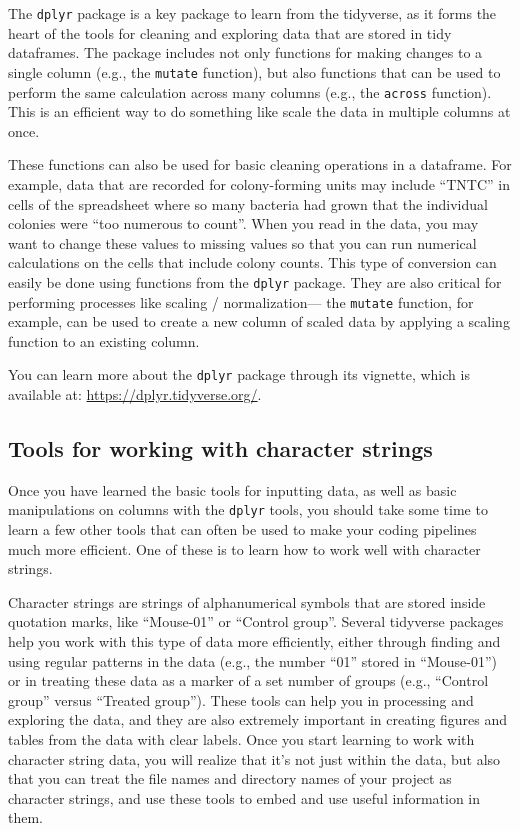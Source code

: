 \documentclass[]{tufte-book}
\begin{document}
The \texttt{dplyr} package is a key package to learn from the tidyverse, as it forms
the heart of the tools for cleaning and exploring data that are stored in tidy
dataframes. The package includes not only functions for making changes to a
single column (e.g., the \texttt{mutate} function), but also functions that can be used
to perform the same calculation across many columns (e.g., the \texttt{across}
function). This is an efficient way to do something like scale the data in
multiple columns at once.

These functions can also be used for basic cleaning operations in a dataframe.
For example, data that are recorded for colony-forming units may include ``TNTC''
in cells of the spreadsheet where so many bacteria had grown that the individual
colonies were ``too numerous to count''. When you read in the data, you may want
to change these values to missing values so that you can run numerical
calculations on the cells that include colony counts. This type of conversion
can easily be done using functions from the \texttt{dplyr} package. They are also
critical for performing processes like scaling / normalization--- the \texttt{mutate}
function, for example, can be used to create a new column of scaled data by
applying a scaling function to an existing column.

You can learn more about the \texttt{dplyr} package through its vignette, which is
available at: \url{https://dplyr.tidyverse.org/}.

\subsection{Tools for working with character strings}\label{tools-for-working-with-character-strings}

Once you have learned the basic tools for inputting data, as well as basic
manipulations on columns with the \texttt{dplyr} tools, you should take some time to
learn a few other tools that can often be used to make your coding pipelines
much more efficient. One of these is to learn how to work well with character
strings.

Character strings are strings of alphanumerical symbols that are stored
inside quotation marks, like ``Mouse-01'' or ``Control group''. Several tidyverse
packages help you work with this type of data more efficiently, either through
finding and using regular patterns in the data (e.g., the number ``01'' stored in
``Mouse-01'') or in treating these data as a marker of a set number of groups
(e.g., ``Control group'' versus ``Treated group''). These tools can help you in
processing and exploring the data, and they are also extremely important in
creating figures and tables from the data with clear labels. Once you start
learning to work with character string data, you will realize that it's not just
within the data, but also that you can treat the file names and directory names
of your project as character strings, and use these tools to embed and use
useful information in them.
\end{document}
